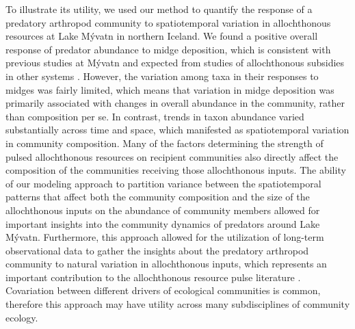 To illustrate its utility, we used our method to quantify the response of a predatory
arthropod community to spatiotemporal variation in allochthonous resources at
Lake M\'{y}vatn in northern Iceland.
We found a positive overall response of predator abundance to midge deposition,
which is consistent with previous studies at M\'{y}vatn
\citep{Hoekman2011, Hoekman2019, Dreyer2012, Sanchez2018} and
expected from studies of allochthonous subsidies in other systems
\citep{Murphy2012, Ostfeld2000, Yang2010}.
However, the variation among taxa in their responses to midges was fairly limited,
which means that variation in midge deposition was primarily associated with changes
in overall abundance in the community, rather than composition per se.
In contrast, trends in taxon abundance varied substantially across time and space,
which manifested as spatiotemporal variation in community composition.
Many of the factors determining the strength of pulsed allochthonous resources on
recipient communities \citep[e.g. landscape features;][]{Polis1997} also directly
affect the composition of the communities receiving those allochthonous inputs.
The ability of our modeling approach to partition variance between the spatiotemporal
patterns that affect both the community composition and the size of the allochthonous
inputs on the abundance of community members allowed for important insights into the
community dynamics of predators around Lake M\'{y}vatn.
Furthermore, this approach allowed for the utilization of long-term observational
data to gather the insights about the predatory arthropod community to natural
variation in allochthonous inputs, which represents an important contribution to the
allochthonous resource pulse literature \citep{Yang2008}.
Covariation between different drivers of ecological communities is common,
therefore this approach may have utility across many subdisciplines of community ecology.






